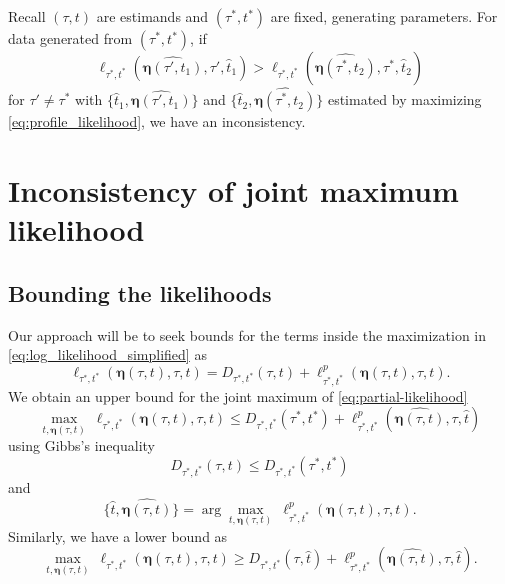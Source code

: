 \documentclass[a4paper]{article}
\newcommand{\fullAncestralSplitPartitions}{\boldsymbol\eta}
\newcommand{\shannonDivergence}{D}
\begin{document}
Recall $(\tau, t)$ are estimands and $(\tau^*, t^*)$ are fixed, generating parameters.
For data generated from $(\tau^*, t^*)$, if
\begin{equation}
\label{eq:inconsistency_inequality}
\ell_{\tau^*,t^*}(\widehat{\fullAncestralSplitPartitions(\tau',t_1)},\tau',\hat{t}_1) > \ell_{\tau^*,t^*}(\widehat{\fullAncestralSplitPartitions(\tau^*,t_2)},\tau^*,\hat{t}_2)
\end{equation}
for $\tau'\neq\tau^*$ with $\{\hat{t}_1,\widehat{\fullAncestralSplitPartitions(\tau',t_1)}\}$ and $\{\hat{t}_2,\widehat{\fullAncestralSplitPartitions(\tau^*,t_2)}\}$ estimated by maximizing \eqref{eq:profile_likelihood}, we have an inconsistency.

\section{Inconsistency of joint maximum likelihood}

\subsection{Bounding the likelihoods}

Our approach will be to seek bounds for the terms inside the maximization in \eqref{eq:log_likelihood_simplified} as
\begin{equation}
\label{eq:partial-likelihood}
\ell_{\tau^*,t^*}(\fullAncestralSplitPartitions(\tau,t),\tau,t) = \shannonDivergence_{\tau^*,t^*}(\tau,t) + \ell^p_{\tau^*,t^*}(\fullAncestralSplitPartitions(\tau,t),\tau,t).
\end{equation}
We obtain an upper bound for the joint maximum of \eqref{eq:partial-likelihood}
$$
\max_{t,\fullAncestralSplitPartitions(\tau,t)} \ \ell_{\tau^*,t^*}(\fullAncestralSplitPartitions(\tau,t),\tau,t) \le
    \shannonDivergence_{\tau^*,t^*}(\tau^*,t^*)
    + \ell^p_{\tau^*,t^*}(\widehat{\fullAncestralSplitPartitions(\tau,t)},\tau,\hat{t})
$$
using Gibbs's inequality
$$
\shannonDivergence_{\tau^*,t^*}(\tau,t) \le \shannonDivergence_{\tau^*,t^*}(\tau^*,t^*)
$$
and
$$
\{\hat{t},\widehat{\fullAncestralSplitPartitions(\tau,t)}\} = \arg\max_{t,\fullAncestralSplitPartitions(\tau,t)} \ \ell^p_{\tau^*,t^*}(\fullAncestralSplitPartitions(\tau,t),\tau,t).
$$
Similarly, we have a lower bound as
$$
\max_{t,\fullAncestralSplitPartitions(\tau,t)} \ \ell_{\tau^*,t^*}(\fullAncestralSplitPartitions(\tau,t),\tau,t) \ge
    \shannonDivergence_{\tau^*,t^*}(\tau,\hat{t})
    + \ell^p_{\tau^*,t^*}(\widehat{\fullAncestralSplitPartitions(\tau,t)},\tau,\hat{t}).
$$
\end{document}
